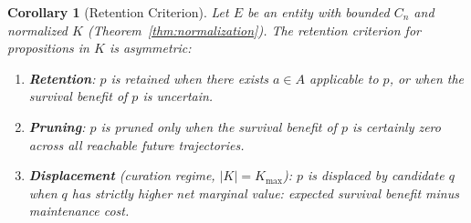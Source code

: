 \documentclass[11pt]{article}
\newtheorem{corollary}[theorem]{Corollary}
\theoremstyle{definition}
\theoremstyle{remark}
\begin{document}
\begin{corollary}[Retention Criterion]
\label{cor:retention}
Let $E$ be an entity with bounded $C_n$ and normalized $K$
(Theorem~\ref{thm:normalization}). The retention criterion for
propositions in $K$ is asymmetric:
\begin{enumerate}
\item[(R)] \textbf{Retention}: $p$ is retained when there exists $a \in A$
applicable to $p$, or when the survival benefit of $p$ is uncertain.
\item[(P)] \textbf{Pruning}: $p$ is pruned only when the survival benefit
of $p$ is certainly zero across all reachable future trajectories.
\item[(D)] \textbf{Displacement} (curation regime, $|K| = K_{\max}$):
$p$ is displaced by candidate $q$ when $q$ has strictly higher net
marginal value: expected survival benefit minus maintenance cost.
\end{enumerate}
\end{corollary}
\end{document}

